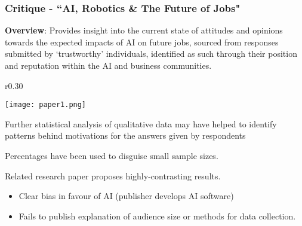 \documentclass[10pt, compress]{beamer}
\begin{document}
\begin{frame}[fragile]
  \frametitle{Critique - ``AI, Robotics \& The Future of Jobs"}
  
   \small{ 
   	
   	\textbf{Overview}: Provides insight into the current state of attitudes and opinions towards the expected impacts of AI on future jobs, sourced from responses submitted by `trustworthy' individuals, identified as such through their position and reputation within the AI and business communities.
   	

		       \begin{wrapfigure}{r}{0.30\textwidth}
   \vspace{-25pt}
  \begin{center}
    \texttt{[image: paper1.png]}
  \end{center}
  \vspace{-50pt}
  \end{wrapfigure}
   	
   	Further statistical analysis of qualitative data may have helped to identify patterns behind motivations for the answers given by respondents 
%   	
   	
   	
   	Percentages have been used to disguise small sample sizes.
   	
   	Related research paper proposes highly-contrasting results.
   	
   	\footnotesize {
   	\begin{itemize}
   	\item[] Clear bias in favour of AI (publisher develops AI software)
   	\item[] Fails to publish explanation of audience size or methods for data collection.
   \end{itemize}
   
   }
   	
     }

\end{frame}


%
%
%
%



\end{document}
